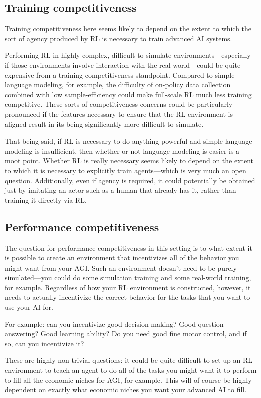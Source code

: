 \documentclass[
  onecolumn,
  natbib,
]{miri-tech-article}
\begin{document}
\subsection{Training competitiveness} Training competitiveness here seems likely to depend on the extent to which the sort of agency produced by RL is necessary to train advanced AI systems.

Performing RL in highly complex, difficult-to-simulate environments---especially if those environments involve interaction with the real world---could be quite expensive from a training competitiveness standpoint. Compared to simple language modeling, for example, the difficulty of on-policy data collection combined with low sample-efficiency could make full-scale RL much less training competitive. These sorts of competitiveness concerns could be particularly pronounced if the features necessary to ensure that the RL environment is aligned result in its being significantly more difficult to simulate.

That being said, if RL is necessary to do anything powerful and simple language modeling is insufficient, then whether or not language modeling is easier is a moot point. Whether RL is really necessary seems likely to depend on the extent to which it is necessary to explicitly train agents---which is very much an open question. Additionally, even if agency is required, it could potentially be obtained just by imitating an actor such as a human that already has it, rather than training it directly via RL.

\subsection{Performance competitiveness} The question for performance competitiveness in this setting is to what extent it is possible to create an environment that incentivizes all of the behavior you might want from your AGI. Such an environment doesn't need to be purely simulated---you could do some simulation training and some real-world training, for example. Regardless of how your RL environment is constructed, however, it needs to actually incentivize the correct behavior for the tasks that you want to use your AI for.

For example: can you incentivize good decision-making? Good question-answering? Good learning ability? Do you need good fine motor control, and if so, can you incentivize it?

These are highly non-trivial questions: it could be quite difficult to set up an RL environment to teach an agent to do all of the tasks you might want it to perform to fill all the economic niches for AGI, for example. This will of course be highly dependent on exactly what economic niches you want your advanced AI to fill.
\end{document}
